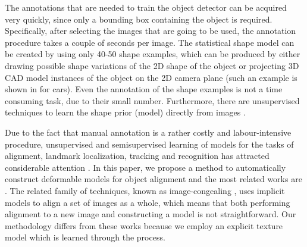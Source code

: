 The
annotations that are needed to train the object detector can
be acquired very quickly, since only a bounding box containing the object is required. Specifically, after selecting
the images that are going to be used, the annotation procedure
takes a couple of seconds per image. The statistical
shape model can be created by using only 40-50 shape examples,
which can be produced by either drawing possible
shape variations of the 2D shape of the object or projecting
3D CAD model instances of the object on the 2D camera
plane (such an example is shown in \cite{?} for cars). Even
the annotation of the shape examples is not a time consuming
task, due to their small number. Furthermore, there are
unsupervised techniques to learn the shape prior (model) directly
from images \cite{?}.

Due to the fact that manual annotation is a rather costly
and labour-intensive procedure, unsupervised and semisupervised
learning of models for the tasks of alignment,
landmark localization, tracking and recognition has attracted
considerable attention \cite{?}. In this paper, we
propose a method to automatically construct deformable
models for object alignment and the most related works
are \cite{?}. The related family of techniques,
known as image-congealing \cite{?}, uses implicit
models to align a set of images as a whole, which means
that both performing alignment to a new image and constructing
a model is not straightforward. Our methodology
differs from these works because we employ an explicit texture
model which is learned through the process.

